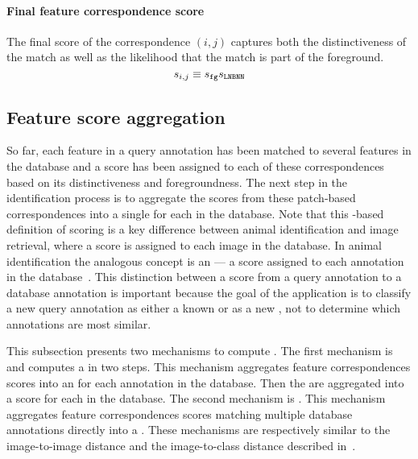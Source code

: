         \paragraph{Final feature correspondence score}
            The final score of the correspondence $(i, j)$ captures
              both the distinctiveness of the match as well as the
              likelihood that the match is part of the foreground.
              \begin{equation}\label{eqn:featscore}
                  s_{i,j} \equiv s_{{\tt fg}} s_{\tt{LNBNN}} 
              \end{equation}

    \subsection{Feature score aggregation}\label{subsec:namescore}

        So far, each feature in a query annotation has been matched to
          several features in the database and a score has been assigned
          to each of these correspondences based on its distinctiveness
          and foregroundness.
        The next step in the identification process is to aggregate the
          scores from these patch-based correspondences into a single
          \glossterm{\namescore} for each \name{} in the database.
        Note that this \name-based definition of scoring is a key
          difference between animal identification and image retrieval,
          where a score is assigned to each image in the database.
        In animal identification the analogous concept is an
          \glossterm{\annotscore} --- a score assigned to each annotation
          in the database~\cite{philbin_object_2007}.
        This distinction between a score from a query annotation to a
          database annotation is important because the goal of the
          application is to classify a new query annotation as either a
          known \name{} or as a new \name{}, not to determine which
          annotations are most similar.

        This subsection presents two mechanisms to compute
          \namescores{}.
        The first mechanism is \csumprefix{} and computes a
          \namescore{} in two steps.
        This mechanism aggregates feature correspondences scores into
          an \annotscore{} for each annotation in the database.
        Then the \annotscores{} are aggregated into a score for each
          \name{} in the database.
        The second mechanism is \nsumprefix{}.
        This mechanism aggregates feature correspondences scores
          matching multiple database annotations directly into a
          \namescore{}.
        These mechanisms are respectively similar to the image-to-image
          distance and the image-to-class distance described
          in~\cite{boiman_defense_2008}.

